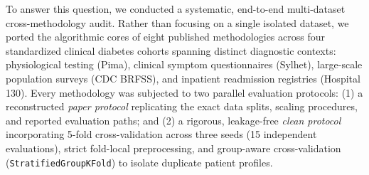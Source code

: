 \documentclass[journal,twocolumn]{IEEEtran}
\begin{document}
To answer this question, we conducted a systematic, end-to-end multi-dataset cross-methodology audit. Rather than focusing on a single isolated dataset, we ported the algorithmic cores of eight published methodologies across four standardized clinical diabetes cohorts spanning distinct diagnostic contexts: physiological testing (Pima), clinical symptom questionnaires (Sylhet), large-scale population surveys (CDC BRFSS), and inpatient readmission registries (Hospital 130). Every methodology was subjected to two parallel evaluation protocols: (1) a reconstructed \emph{paper protocol} replicating the exact data splits, scaling procedures, and reported evaluation paths; and (2) a rigorous, leakage-free \emph{clean protocol} incorporating 5-fold cross-validation across three seeds (15 independent evaluations), strict fold-local preprocessing, and group-aware cross-validation (\texttt{StratifiedGroupKFold}) to isolate duplicate patient profiles.
\end{document}
